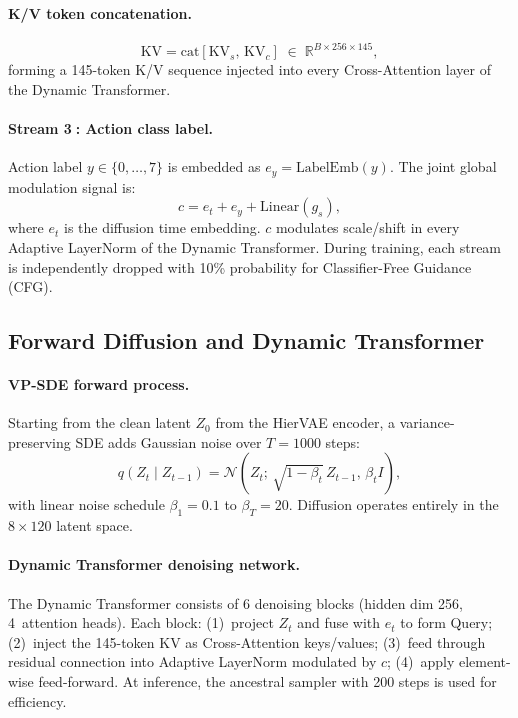 \documentclass{article}
\newcommand{\Rbb}{\mathbb{R}}
\begin{document}
\paragraph{K/V token concatenation.}
\begin{equation}
  \mathrm{KV}
    = \mathrm{cat}[\mathrm{KV}_s,\,\mathrm{KV}_c]
    \;\in\;\Rbb^{B\times256\times145},
\end{equation}
forming a 145-token K/V sequence injected into every Cross-Attention layer of
the Dynamic Transformer.

\paragraph{Stream \textcircled{3}: Action class label.}
Action label $y\!\in\!\{0,\ldots,7\}$ is embedded as
$e_y\!=\!\mathrm{LabelEmb}(y)$.
The joint global modulation signal is:
\begin{equation}
  c = e_t + e_y + \mathrm{Linear}(g_s),
\end{equation}
where $e_t$ is the diffusion time embedding.
$c$ modulates scale/shift in every Adaptive LayerNorm of the Dynamic Transformer.
During training, each stream is independently dropped with 10\% probability for
Classifier-Free Guidance (CFG).

\subsection{Forward Diffusion and Dynamic Transformer}
\label{sec:diffusion}

\paragraph{VP-SDE forward process.}
Starting from the clean latent $Z_0$ from the HierVAE encoder, a
variance-preserving SDE adds Gaussian noise over $T\!=\!1000$ steps:
\begin{equation}
  q(Z_t\mid Z_{t-1})
    = \mathcal{N}\!\left(Z_t;\,\sqrt{1-\beta_t}\,Z_{t-1},\,\beta_t I\right),
\end{equation}
with linear noise schedule $\beta_1\!=\!0.1$ to $\beta_T\!=\!20$.
Diffusion operates entirely in the $8\!\times\!120$ latent space.

\paragraph{Dynamic Transformer denoising network.}
The Dynamic Transformer consists of 6 denoising blocks (hidden dim 256,
4~attention heads).
Each block: (1)~project $Z_t$ and fuse with $e_t$ to form Query;
(2)~inject the 145-token $\mathrm{KV}$ as Cross-Attention keys/values;
(3)~feed through residual connection into Adaptive LayerNorm modulated by $c$;
(4)~apply element-wise feed-forward.
At inference, the ancestral sampler with 200 steps is used for efficiency.
\end{document}
